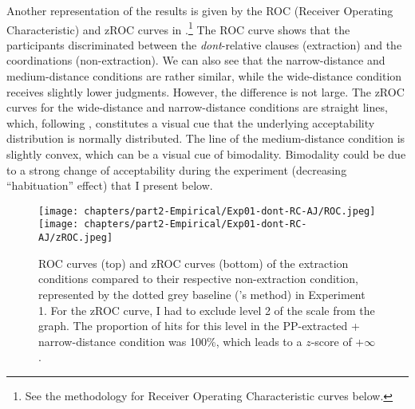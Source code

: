 Another representation of the results is given by the ROC (Receiver Operating Characteristic) and zROC curves in .\footnote{See the methodology for Receiver Operating Characteristic curves below.} The ROC curve shows that the participants discriminated between the \emph{dont}-relative clauses (extraction) and the coordinations (non-extraction). We can also see that the narrow-distance and medium-distance conditions are rather similar, while the wide-distance condition receives slightly lower judgments. However, the difference is not large. The zROC curves for the wide-distance and narrow-distance conditions are straight lines, which, following \citet[21--22]{Dillon.2019}, constitutes a visual cue that the underlying acceptability distribution is normally distributed. The line of the medium-distance condition is slightly convex, which can be a visual cue of bimodality. Bimodality could be due to a strong change of acceptability during the experiment (decreasing ``habituation'' effect) that I present below.

\begin{figure}
    \centering
    \texttt{[image: chapters/part2-Empirical/Exp01-dont-RC-AJ/ROC.jpeg]}
    \texttt{[image: chapters/part2-Empirical/Exp01-dont-RC-AJ/zROC.jpeg]}
    \caption{ROC curves (top) and zROC curves (bottom) of the extraction conditions compared to their respective non-extraction condition, represented by the dotted grey baseline (\citeauthor{Dillon.2019}'s  method) in Experiment 1. For the zROC curve, I had to exclude level 2 of the scale from the graph. The proportion of hits for this level in the PP-extracted + narrow-distance condition was 100\%, which leads to a $z$-score of +$\infty$.}
    \label{fig:exp01-ROC}
\end{figure}

